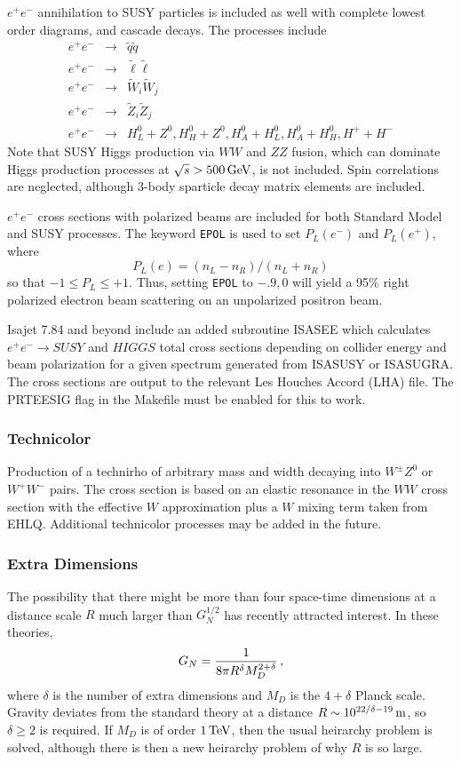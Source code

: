      $e^+e^-$ annihilation to SUSY particles is included as well with
complete lowest order diagrams, and cascade decays.  The processes
include
\begin{eqnarray*}
e^+ e^- &\to& \tilde q \tilde q \\
e^+ e^- &\to& \tilde\ell \tilde\ell \\
e^+ e^- &\to& \tilde W_i \tilde W_j \\
e^+ e^- &\to& \tilde Z_i \tilde Z_j \\
e^+ e^- &\to& H_L^0+Z^0,H_H^0+Z^0,H_A^0+H_L^0,H_A^0+H_H^0,H^++H^-
\end{eqnarray*}
Note that SUSY Higgs production via $WW$ and $ZZ$ fusion, which can
dominate Higgs production processes at $\sqrt{s} > 500\,{\rm GeV}$,
is not included. Spin correlations are neglected, although 
3-body sparticle decay matrix elements are included.

      $e^+e^-$ cross sections with polarized beams are included for
both Standard Model and SUSY processes. The keyword \verb|EPOL| is
used to set $P_L(e^-)$ and $P_L(e^+)$, where
$$
P_L(e) = (n_L-n_R)/(n_L+n_R)
$$
so that $-1 \le P_L \le +1$. Thus, setting \verb|EPOL| to $-.9,0$ will
yield a 95\% right polarized electron beam scattering on an unpolarized
positron beam.

Isajet 7.84 and beyond include an added subroutine ISASEE which calculates
$e^+e^-\rightarrow SUSY$ and $HIGGS$ total cross sections 
depending on collider energy and beam polarization for a given spectrum
generated from ISASUSY or ISASUGRA. The cross sections are output to the
relevant Les Houches Accord (LHA) file. The PRTEESIG flag in the 
Makefile must be enabled for this to work.

\subsubsection{Technicolor} Production of a technirho of arbitrary
mass and width decaying into $W^\pm Z^0$ or $W^+ W^-$ pairs. The cross
section is based on an elastic resonance in the $WW$ cross section
with the effective $W$ approximation plus a $W$ mixing term taken from
EHLQ.  Additional technicolor processes may be added in the future.

\subsubsection{Extra Dimensions} The possibility that there might be
more than four space-time dimensions at a distance scale $R$ much larger
than $G_N^{1/2}$ has recently attracted interest. In these theories,
$$ 
G_N = {1 \over 8\pi R^\delta M_D^{2+\delta}}\,, 
$$
where $\delta$ is the number of extra dimensions and $M_D$ is the
$4+\delta$ Planck scale. Gravity deviates from the standard theory at a
distance $R \sim 10^{22/\delta-19}\,{\rm m}$, so $\delta\ge2$ is
required. If $M_D$ is of order $1\,{\rm TeV}$, then the usual heirarchy
problem is solved, although there is then a new heirarchy problem of why
$R$ is so large.

